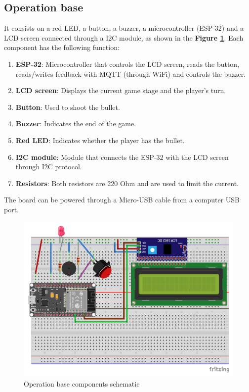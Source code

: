 \documentclass[../main.tex]{subfiles}
\begin{document}
\subsection{Operation base}

It consists on a red LED, a button, a buzzer, a microcontroller (ESP-32) and a LCD screen connected through a I2C module, as shown in the \textbf{Figure \ref{fig:base}}. Each component has the following function:

\begin{enumerate}
    \item \textbf{ESP-32}: Microcontroller that controls the LCD screen, reads the button, reads/writes feedback with MQTT (through WiFi) and controls the buzzer.
    \item \textbf{LCD screen}: Displays the current game stage and the player's turn.
    \item \textbf{Button}: Used to shoot the bullet.
    \item \textbf{Buzzer}: Indicates the end of the game.
    \item \textbf{Red LED}: Indicates whether the player has the bullet.
    \item \textbf{I2C module}: Module that connects the ESP-32 with the LCD screen through I2C protocol.
    \item \textbf{Resistors}: Both resistors are 220 Ohm and are used to limit the current.
\end{enumerate}

The board can be powered through a Micro-USB cable from a computer USB port.

\begin{figure}
    \centering
    \includegraphics[width= 0.99\linewidth]{../media/figures/schematic_bb.pdf}
    \caption{Operation base components schematic}
    \label{fig:base}
\end{figure}
\end{document}
